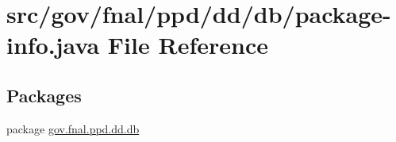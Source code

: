 \hypertarget{gov_2fnal_2ppd_2dd_2db_2package-info_8java}{\section{src/gov/fnal/ppd/dd/db/package-\/info.java File Reference}
\label{gov_2fnal_2ppd_2dd_2db_2package-info_8java}
}
\subsection*{Packages}
\begin{DoxyCompactItemize}
\item 
package \hyperlink{namespacegov_1_1fnal_1_1ppd_1_1dd_1_1db}{gov.\-fnal.\-ppd.\-dd.\-db}
\end{DoxyCompactItemize}

